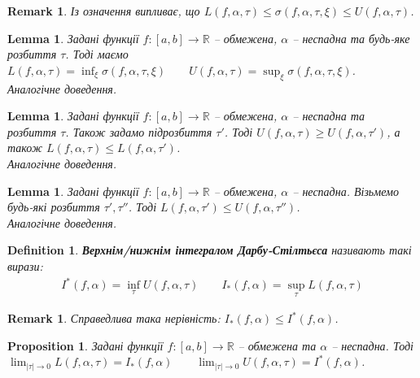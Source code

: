 \documentclass[a4paper, 10pt]{article}
\theoremstyle{theoremdd}
\theoremstyle{theoremdd}
\theoremstyle{theoremdd}
\newtheorem{definition}[theorem]{Definition}
\theoremstyle{theoremdd}
\theoremstyle{theoremdd}
\theoremstyle{theoremdd}
\newtheorem{proposition}[theorem]{Proposition}
\theoremstyle{theoremdd}
\newtheorem{remark}[theorem]{Remark}
\theoremstyle{theoremdd}
\newtheorem{lemma}[theorem]{Lemma}
\theoremstyle{theoremdd}
\begin{document}
\begin{remark}
Із означення випливає, що $L(f,\alpha,\tau) \leq \sigma(f,\alpha,\tau,\xi) \leq U(f,\alpha,\tau)$.
\end{remark}

\begin{lemma}
Задані функції $f \colon [a,b] \to \mathbb{R}$ -- обмежена, $\alpha$ -- неспадна та будь-яке розбиття $\tau$. Тоді маємо $\displaystyle L(f,\alpha,\tau) = \inf_\xi \sigma(f,\alpha,\tau,\xi) \qquad U(f,\alpha,\tau) = \sup_\xi \sigma (f,\alpha,\tau,\xi)$.\\
\textit{Аналогічне доведення.}
\end{lemma}

\begin{lemma}
Задані функції $f \colon [a,b] \to \mathbb{R}$ -- обмежена, $\alpha$ -- неспадна та розбиття $\tau$. Також задамо підрозбиття $\tau'$. Тоді $U(f,\alpha,\tau) \geq U(f,\alpha,\tau')$, а також $L(f,\alpha,\tau) \leq L(f,\alpha,\tau')$.\\
\textit{Аналогічне доведення.}
\end{lemma}

\begin{lemma}
Задані функції $f \colon [a,b] \to \mathbb{R}$ -- обмежена, $\alpha$ -- неспадна. Візьмемо будь-які розбиття $\tau',\tau''$. Тоді $L(f,\alpha,\tau') \leq U(f,\alpha,\tau'')$.\\
\textit{Аналогічне доведення.}
\end{lemma}

\begin{definition}
\textbf{Верхнім/нижнім інтегралом Дарбу-Стілтьєса} називають такі вирази:
\begin{align*}
I^*(f,\alpha) = \inf_\tau U(f,\alpha,\tau) \qquad I_*(f,\alpha) = \sup_\tau L(f,\alpha,\tau)
\end{align*}
\end{definition}

\begin{remark}
Справедлива така нерівність: $I_*(f,\alpha) \leq I^*(f,\alpha)$.
\end{remark}

\begin{proposition}
Задані функції $f \colon [a,b] \to \mathbb{R}$ -- обмежена та $\alpha$ -- неспадна. Тоді\\
$\displaystyle\lim_{|\tau| \to 0} L(f,\alpha,\tau) = I_*(f,\alpha) \qquad \lim_{|\tau| \to 0} U(f,\alpha,\tau) = I^*(f,\alpha)$.
\end{proposition}
\end{document}
